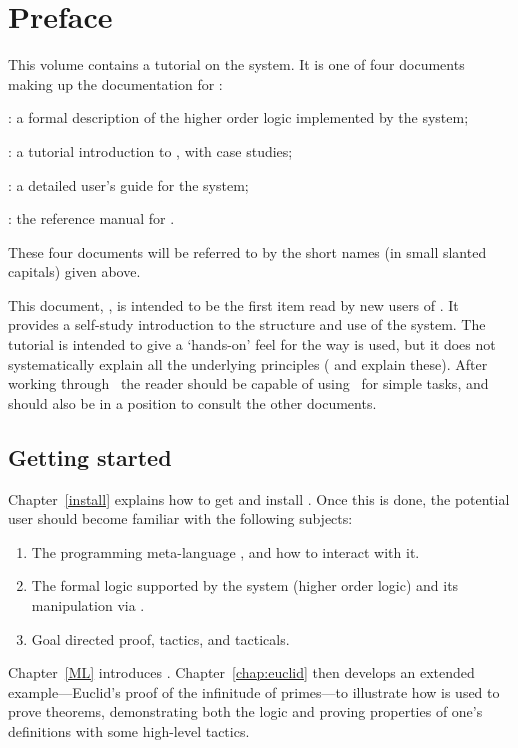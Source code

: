 \chapter*{Preface}
\label{intro}

This volume contains a tutorial on the \HOL{} system.  It is one of four
documents making up the documentation for \HOL:

\begin{myenumerate}
\item \LOGIC: a formal description of the higher order logic
  implemented by the \HOL{} system;
\item \TUTORIAL: a tutorial introduction to \HOL, with case studies;
\item \DESCRIPTION: a detailed user's guide for the \HOL{} system;
\item \REFERENCE: the reference manual for \HOL.
\end{myenumerate}

\noindent These four documents will be referred to by the short names (in
small slanted capitals) given above.

This document, \TUTORIAL, is intended to be the first item read by new
users of \HOL.  It provides a self-study introduction to the structure
and use of the system.  The tutorial is intended to give a `hands-on'
feel for the way \HOL{} is used, but it does not systematically
explain all the underlying principles (\DESCRIPTION{} and \LOGIC{}
explain these).  After working through \TUTORIAL\ the reader should be
capable of using \HOL\ for simple tasks, and should also be in a
position to consult the other documents.

\section*{Getting started}

Chapter~\ref{install} explains how to get and install \HOL.  Once this
is done, the potential \HOL{} user should become familiar with the
following subjects:
%
\begin{enumerate}
\item The programming meta-language \ML, and how to interact with it.
\item The formal logic supported by the \HOL{} system (higher order
  logic) and its manipulation via \ML.
\item Goal directed proof, tactics, and tacticals.
\end{enumerate}
%
Chapter~\ref{ML} introduces \ML{}.
Chapter~\ref{chap:euclid} then develops an extended example---Euclid's
proof of the infinitude of primes---to illustrate how \HOL{} is used
to prove theorems, demonstrating both the logic and proving properties of one's definitions with some high-level tactics.

